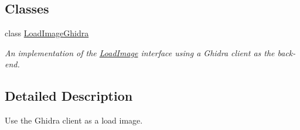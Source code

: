 \subsection*{Classes}
\begin{DoxyCompactItemize}
\item 
class \mbox{\hyperlink{class_load_image_ghidra}{Load\+Image\+Ghidra}}
\begin{DoxyCompactList}\small\item\em An implementation of the \mbox{\hyperlink{class_load_image}{Load\+Image}} interface using a Ghidra client as the back-\/end. \end{DoxyCompactList}\end{DoxyCompactItemize}


\subsection{Detailed Description}
Use the Ghidra client as a load image. 


